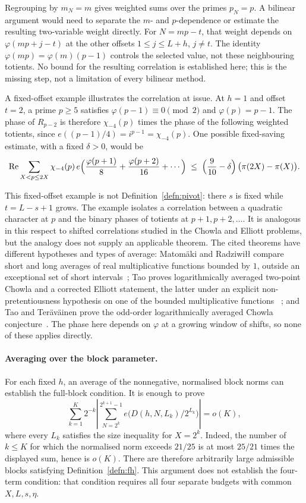 Regrouping by $m_N=m$ gives weighted sums over the primes $p_N=p$.
A bilinear argument would need to separate the $m$- and $p$-dependence or
estimate the resulting two-variable weight directly. For $N=mp-t$,
that weight depends on $\varphi(mp+j-t)$ at the other offsets
$1\le j\le L+h$, $j\ne t$. The identity
$\varphi(mp)=\varphi(m)(p-1)$ controls the selected value, not these
neighbouring totients. No bound for the resulting correlation is
established here; this is the missing step, not a limitation of every
bilinear method.

A fixed-offset example illustrates the correlation at issue. At $h=1$
and offset $t=2$, a prime $p\ge5$ satisfies $\varphi(p-1)\equiv0\pmod2$
and $\varphi(p)=p-1$. The phase of $R_{p-2}$ is therefore
$\chi_{-4}(p)$ times the phase of the following weighted totients, since
$e((p-1)/4)=i^{p-1}=\chi_{-4}(p)$. One possible fixed-saving estimate,
with a fixed $\delta>0$, would be
\[
  \operatorname{Re}\sum_{X<p\le 2X}\chi_{-4}(p)\,
    e\Bigl(\frac{\varphi(p+1)}{8}+\frac{\varphi(p+2)}{16}+\cdots\Bigr)
  \;\le\;\Bigl(\frac{9}{10}-\delta\Bigr)\,\bigl(\pi(2X)-\pi(X)\bigr).
\]

This fixed-offset example is not Definition~\ref{defn:pivot}: there $s$
is fixed while $t=L-s+1$ grows. The example isolates a correlation between
a quadratic character at $p$ and the binary phases of totients at
$p+1,p+2,\ldots$. It is analogous in this respect to shifted correlations
studied in the Chowla and Elliott problems, but the analogy does not
supply an applicable theorem. The cited theorems have different hypotheses and types of average: Matom\"aki and Radziwi\l{}\l{} compare short and long averages of
real multiplicative functions bounded by $1$, outside an exceptional set of
short intervals~\cite[Theorem~1]{matomaki-radziwill}; Tao proves logarithmically averaged two-point Chowla and a corrected
Elliott statement, the latter under an explicit non-pretentiousness
hypothesis on one of the bounded multiplicative functions
~\cite[Theorems~1.2--1.3]{tao-elliott}; and Tao and Ter\"av\"ainen
prove the odd-order logarithmically averaged Chowla
conjecture~\cite[Theorem~1.1]{tao-teravainen}. The phase here
depends on $\varphi$ at a growing window of shifts, so none of these applies
directly.

\paragraph{Averaging over the block parameter.}
For each fixed $h$, an average of the nonnegative, normalised block norms
can establish the full-block condition. It is enough to prove
\[
 \sum_{k=1}^{K}2^{-k}
 \left|\sum_{N=2^k}^{2^{k+1}-1}
       e\bigl(D(h,N,L_k)/2^{L_k}\bigr)\right|=o(K),
\]
where every $L_k$ satisfies the size inequality for $X=2^k$.
Indeed, the number of $k\le K$ for which the normalised norm exceeds
$21/25$ is at most $25/21$ times the displayed sum, hence is $o(K)$.
There are therefore arbitrarily large admissible blocks satisfying
Definition~\ref{defn:fh}. This argument does not establish the four-term
condition: that condition requires all four separate budgets with common
$X,L,s,\eta$.

